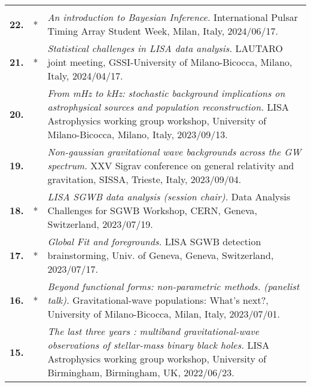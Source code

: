 {\begin{longtable}{rp{0.3cm}p{15.8cm}}
\vspace{0.05cm}\\
%
\textbf{22.} & * & \textit{An introduction to Bayesian Inference.}
\newline{}
International Pulsar Timing Array Student Week, Milan, Italy, 2024/06/17.
\vspace{0.05cm}\\
%
\textbf{21.} & * & \textit{Statistical challenges in LISA data analysis.}
\newline{}
LAUTARO joint meeting, GSSI-University of Milano-Bicocca, Milano, Italy, 2024/04/17.
\vspace{0.05cm}\\
%
\textbf{20.} &  & \textit{From mHz to kHz: stochastic background implications on astrophysical sources and population reconstruction.}
\newline{}
LISA Astrophysics working group workshop, University of Milano-Bicocca, Milano, Italy, 2023/09/13.
\vspace{0.05cm}\\
%
\textbf{19.} &  & \textit{Non-gaussian gravitational wave backgrounds across the GW spectrum.}
\newline{}
XXV Sigrav conference on general relativity and gravitation, SISSA, Trieste, Italy, 2023/09/04.
\vspace{0.05cm}\\
%
\textbf{18.} & * & \textit{LISA SGWB data analysis (session chair).}
\newline{}
Data Analysis Challenges for SGWB Workshop, CERN, Geneva, Switzerland, 2023/07/19.
\vspace{0.05cm}\\
%
\textbf{17.} & * & \textit{Global Fit and foregrounds.}
\newline{}
LISA SGWB detection brainstorming, Univ. of Geneva, Geneva, Switzerland, 2023/07/17.
\vspace{0.05cm}\\
%
\textbf{16.} & * & \textit{Beyond functional forms: non-parametric methods. (panelist talk).}
\newline{}
Gravitational-wave populations: What's next?, University of Milano-Bicocca, Milan, Italy, 2023/07/01.
\vspace{0.05cm}\\
%
\textbf{15.} &  & \textit{The last three years : multiband gravitational-wave observations of stellar-mass binary black holes.}
\newline{}
LISA Astrophysics working group workshop, University of Birmingham, Birmingham, UK, 2022/06/23.

\end{longtable}}
